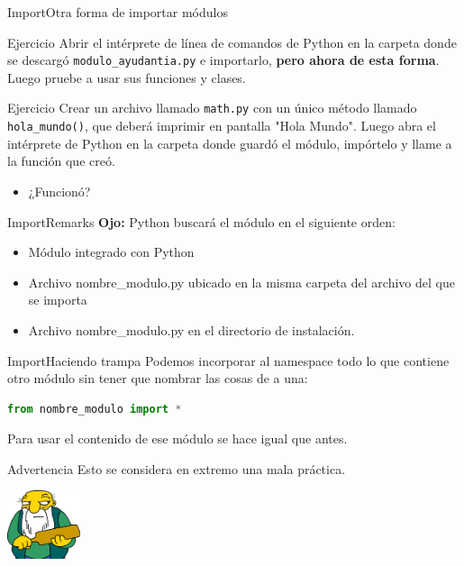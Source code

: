 \documentclass[spanish]{beamer}
\begin{document}
\begin{frame}{Import}{Otra forma de importar módulos}
    \begin{block}{Ejercicio}
        Abrir el intérprete de línea de comandos de Python en la carpeta donde se descargó \texttt{modulo\_ayudantia.py} e importarlo, \textbf{pero ahora de esta forma}. Luego pruebe a usar sus funciones y clases.
    \end{block}
    
    \begin{block}{Ejercicio}
        Crear un archivo llamado \texttt{math.py} con un único método llamado \texttt{hola\_mundo()}, que deberá imprimir en pantalla "Hola Mundo". Luego abra el intérprete de Python en la carpeta donde guardó el módulo, impórtelo y llame a la función que creó.
    \end{block}
    
    \pause
    \begin{itemize}
        \item ¿Funcionó?
    \end{itemize}
\end{frame}

\begin{frame}{Import}{Remarks}
  \textbf{Ojo:} Python buscará el módulo en el siguiente orden:
  \begin{itemize}
    \item Módulo integrado con Python
    \item Archivo nombre\_modulo.py ubicado en la misma carpeta del archivo del que se importa
    \item Archivo nombre\_modulo.py en el directorio de instalación.
  \end{itemize}
\end{frame}

\begin{frame}[fragile]{Import}{Haciendo trampa}
  Podemos incorporar al namespace todo lo que contiene otro módulo sin tener que nombrar las cosas de a una:
  \begin{lstlisting}[language=Python]
  from nombre_modulo import *
  \end{lstlisting}
  Para usar el contenido de ese módulo se hace igual que antes.
  \pause
  \begin{block}{Advertencia}
    \alert{Esto se considera en extremo una mala práctica}.\\
    \begin{center}
      \includegraphics[height=2cm]{Images/hay-tabla.jpg}
    \end{center}
  \end{block}
\end{frame}
\end{document}
